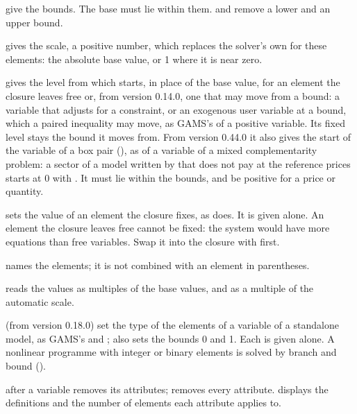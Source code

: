 
\begin{optdesc}
\item[\optarg{lo}{wer}{\#}, \optarg{up}{per}{\#}] give the bounds. The base
must lie within them.  and  remove a lower and an upper
bound.

\item[\optarg{sc}{ale}{\#}] gives the scale, a positive number, which replaces
the solver's own for these elements: the absolute base value, or 1 where it is
near zero.

\item[\optarg{lev}{el}{\#}] gives the level from which 
starts, in place of the base value, for an element the closure leaves free
or, from version 0.14.0, one that may move from a bound: a variable that
adjusts for a constraint, or an exogenous user variable at a bound, which a
paired inequality may move, as GAMS's  of a positive variable. Its
fixed level stays the bound it moves from. From version 0.44.0 it also gives
the start of the variable of a box pair (), as
 of a variable of a mixed complementarity problem: a sector of a
model written by  that does not pay at the reference
prices starts at 0 with . It must lie within the bounds, and
be positive for a price or quantity.

\item[\optarg{}{fix}{\#}] sets the value of an element the closure fixes, as
 does. It is given alone. An element the closure leaves
free cannot be fixed: the system would have more equations than free
variables. Swap it into the closure with  first.

\item[\optarg{el}{ements}{list}] names the elements; it is not combined with
an element in parentheses.

\item[\opt{rel}{ative}] reads the values as multiples of the base values, and
 as a multiple of the automatic scale.

\item[\opt{int}{eger}, \opt{bin}{ary} and \opt{cont}{inuous}] (from version
0.18.0) set the type of the elements of a variable of a standalone model, as
GAMS's  and ;  also
sets the bounds 0 and 1. Each is given alone. A nonlinear programme with
integer or binary elements is solved by branch and bound
().

\item[\opt{}{clear}] after a variable removes its attributes;
 removes every attribute.  displays the
definitions and the number of elements each attribute applies to.
\end{optdesc}

